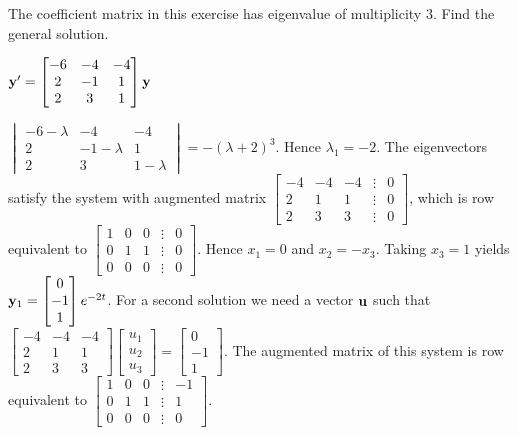 \documentclass{ximera}
\begin{document}
 \begin{problem}\label{exer:10.5.26} 
 The coefficient matrix in this exercise
has eigenvalue of multiplicity $3$. Find the
general solution.

$ {\bf y}'
= \begin{bmatrix}-6 &-4&-4\\2&-1&1\\2&3&1\end{bmatrix}{\bf y}$

\begin{solution}
  $ \begin{vmatrix}-6-\lambda&-4&-4\\2&-1-\lambda&1\\2&3&1-\lambda\end{vmatrix}
=-(\lambda+2)^3$.
Hence $\lambda_1=-2$.
The eigenvectors
 satisfy the system with  augmented matrix
$  \begin{bmatrix}-4&-4&-4&\vdots&0\\2&1&1&
\vdots&0\\2&3&3&\vdots&0 \end{bmatrix}$,
which is row equivalent to
$  \begin{bmatrix}1&0&0&\vdots&0\\0&1&1&
\vdots&0\\0&0&0&\vdots&0 \end{bmatrix}$.
Hence  $x_1=0$ and $x_2=-x_3$.  Taking $x_3=1$
yields
${\bf y}_1=  \begin{bmatrix}0\\-1\\1 \end{bmatrix}e^{-2t}$.
For a second solution we need a vector ${\bf u}$ such that
$  \begin{bmatrix}-4&-4&-4\\2&1&1\\2&3&3 \end{bmatrix} \begin{bmatrix}u_1\\u_2\\u_3 \end{bmatrix}
=  \begin{bmatrix}0\\-1\\1 \end{bmatrix}$.
The augmented matrix of this system is row equivalent to
$  \begin{bmatrix}1&0&0&\vdots&-1\\0&1&1&
\vdots&1\\0&0&0&\vdots&0 \end{bmatrix}$.

\end{solution}
\end{problem}
\end{document}
